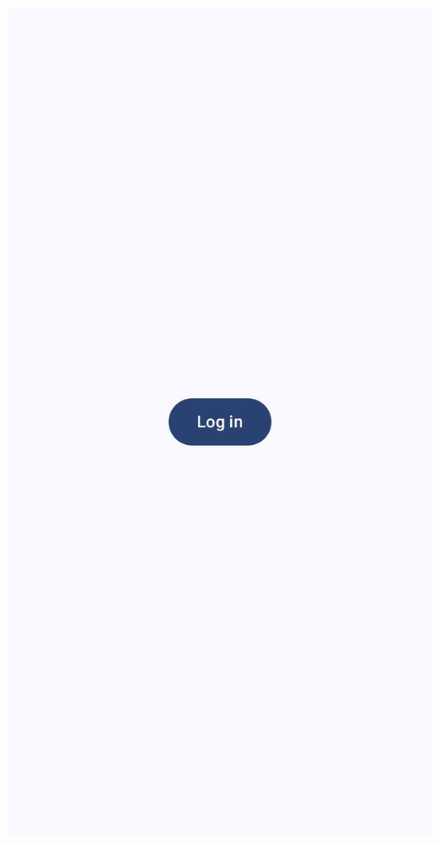 \begin{figure}[H]
\begin{minipage}{0.32\textwidth}
    \includegraphics[width=\textwidth]{english/figures/Screenshot_20250812_212555_Data Access Notifier.jpg}
\end{minipage}
\begin{minipage}{0.32\textwidth}
    \centering

\end{minipage}
\end{figure}
